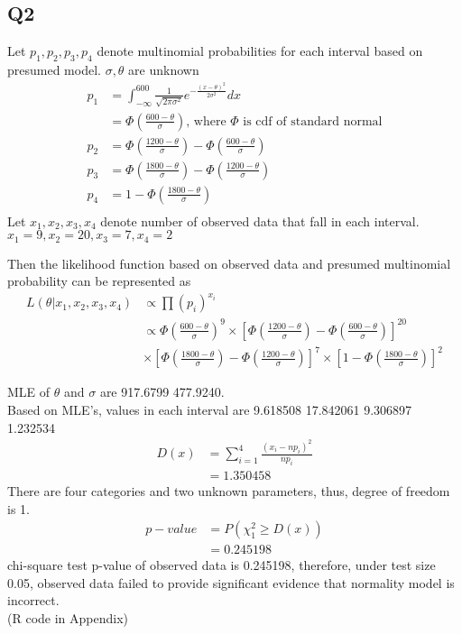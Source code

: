 \documentclass[11pt,letterpaper]{article}
\begin{document}
\subsection*{Q2}
\noindent Let $p_1, p_2, p_3, p_4$ denote multinomial probabilities for each interval based on presumed model. $\sigma, \theta$ are unknown
\begin{align*}
p_1 &= \int_{-\infty}^{600} \frac{1}{\sqrt{2 \pi \sigma^2}} e^{- \frac{(x-\theta)^2}{2 \sigma^2}} dx \\
&= \Phi (\frac{600 - \theta}{\sigma}) \text{, where } \Phi \text{ is cdf of standard normal} \\
p_2 &= \Phi (\frac{1200 - \theta}{\sigma}) - \Phi (\frac{600 - \theta}{\sigma}) \\
p_3 &= \Phi (\frac{1800 - \theta}{\sigma}) - \Phi (\frac{1200 - \theta}{\sigma}) \\
p_4 &= 1 - \Phi (\frac{1800 - \theta}{\sigma}) \\
\end{align*}
\noindent Let $x_1, x_2, x_3, x_4$ denote number of observed data that fall in each interval. \\

\noindent $x_1 = 9, x_2=20, x_3=7, x_4=2$

\noindent Then the likelihood function based on observed data and presumed multinomial probability can be represented as 
\begin{align*}
L(\theta | x_1, x_2, x_3, x_4) &\propto \prod (p_i)^{x_i} \\
&\propto \Phi (\frac{600 - \theta}{\sigma})^9 \times [\Phi (\frac{1200 - \theta}{\sigma}) - \Phi (\frac{600 - \theta}{\sigma})]^{20} \\
& \times [\Phi (\frac{1800 - \theta}{\sigma}) - \Phi (\frac{1200 - \theta}{\sigma})]^{7} \times [1 - \Phi (\frac{1800 - \theta}{\sigma})]^{2}
\end{align*}

\noindent MLE of $\theta$ and $\sigma$ are 917.6799  477.9240. \\

\noindent Based on MLE's, values in each interval are 9.618508 17.842061  9.306897  1.232534
\begin{align*}
D(x) &= \sum_{i=1}^{4} \frac{(x_i - np_i)^2}{np_i} \\
&= 1.350458
\end{align*}
\noindent There are four categories and two unknown parameters, thus, degree of freedom is 1.
\begin{align*}
p-value &= P(\chi^2_1 \geq D(x)) \\
&= 0.245198
\end{align*}
\noindent chi-square test p-value of observed data is 0.245198, therefore, under test size 0.05, observed data failed to provide significant evidence that normality model is incorrect.\\

\noindent (R code in Appendix)
\end{document}
